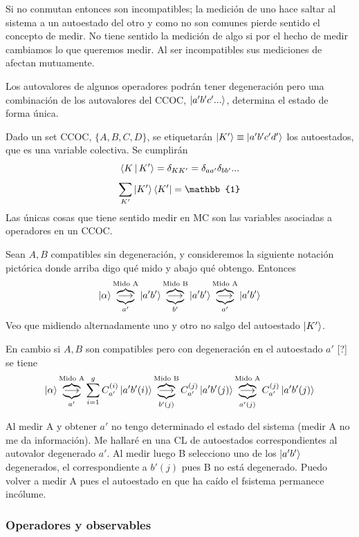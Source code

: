 \documentclass[10pt,oneside]{CBFT_book}
\begin{document}
Si no conmutan entonces son incompatibles; la medición de uno hace saltar al sistema a un autoestado del otro y como no 
son comunes pierde sentido el concepto de medir. No tiene sentido la medición de algo si por el hecho de medir 
cambiamos lo que queremos medir.
Al ser incompatibles sus mediciones de afectan mutuamente.

Los autovalores de algunos operadores podrán tener degeneración pero una combinación de los autovalores del CCOC, 
$\Ket{a'b'c'...}$, determina el estado de forma única.

Dado un set CCOC, $\{A,B,C,D\}$, se etiquetarán $\Ket{K'} \equiv \Ket{a'b'c'd'}$ los autoestados,
que es una variable colectiva.
Se cumplirán
\[
	\Braket{K | K'} = \delta_{KK'} = \delta_{aa'} \delta_{bb'} ...
\]
\[
	\sum_{K'} \Ket{K'}\Bra{K'} = \mathbb{1}
\]
Las únicas cosas que tiene sentido medir en MC son las variables asociadas a operadores en un CCOC.

Sean $A,B$ compatibles sin degeneración, y consideremos la siguiente notación pictórica donde
arriba digo qué mido y abajo qué obtengo. Entonces
\[
	\Ket{\alpha} \overbrace{\underbrace{\longrightarrow}_{a'}}^{\text{Mido A}} \Ket{a'b'}
	\overbrace{\underbrace{\longrightarrow}_{b'}}^{\text{Mido B}} \Ket{a'b'} 
	\overbrace{\underbrace{\longrightarrow}_{a'}}^{\text{Mido A}} \Ket{a'b'}
\]
Veo que midiendo alternadamente uno y otro no salgo del autoestado $\Ket{K'}$. 

En cambio si $A,B$ son compatibles pero con degeneración en el autoestado $a'$ [?] se tiene
\[
	\Ket{\alpha} \overbrace{\underbrace{\longrightarrow}_{a'}}^{\text{Mido A}} 
		\sum_{i=1}^g C_{a'}^{(i)}\Ket{a'b'(i)} \overbrace{\underbrace{\longrightarrow}_{b'(j)}}^{\text{Mido B}} 
		C_{a'}^{(j)}\Ket{a'b'(j)} \overbrace{\underbrace{\longrightarrow}_{a'(j)}}^{\text{Mido A}} 
		C_{a'}^{(j)} \Ket{a'b'(j)}
\]

Al medir A y obtener $a'$ no tengo determinado el estado del sistema (medir A no me da información). 
Me hallaré en una CL de autoestados correspondientes al autovalor degenerado $a'$. Al medir luego B 
selecciono uno de los $\Ket{a'b'}$ degenerados, el correspondiente a $b'(j)$ pues B no está degenerado. 
Puedo volver a medir A pues el autoestado en que ha caído el fsistema permanece incólume.

\subsubsection{Operadores y observables}
\end{document}
